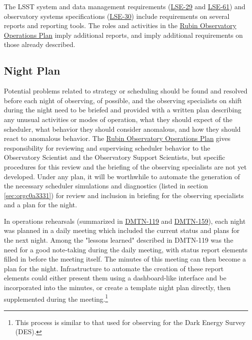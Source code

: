 The LSST system and data management requirements (\href{https://ls.st/lse-29}{LSE-29} and \href{https://ls.st/lse-61}{LSE-61}) and observatory systems specifications (\href{https://ls.st/lse-30}{LSE-30}) include requirements on several reports and reporting tools. The roles and activities in the \href{https://docushare.lsst.org/docushare/dsweb/Get/Document-36797/Rubin\%20Observatory\%20Operations\%20Plan\%20April\%202020.pdf}{Rubin Observatory Operations Plan} imply additional reports, and imply additional requirements on those already described.

\subsection{Night Plan}
\label{sec:org1754a94}

Potential problems related to strategy or scheduling should be found and resolved before each night of observing, of possible, and the observing specialists on shift during the night need to be briefed and provided with a written plan describing any unusual activities or modes of operation, what they should expect of the scheduler, what behavior they should consider anomalous, and how they should react to anomalous behavior.
The \href{https://docushare.lsst.org/docushare/dsweb/Get/Document-36797/Rubin\%20Observatory\%20Operations\%20Plan\%20April\%202020.pdf}{Rubin Observatory Operations Plan} gives responsibility for reviewing and supervising scheduler behavior to the Observatory Scientist and the Observatory Support Scientists, but specific procedures for this review and the briefing of the observing specialists are not yet developed.
Under any plan, it will be worthwhile to automate the generation of the necessary scheduler simulations and diagnostics (listed in section \ref{sec:orgc0a3331}) for review and inclusion in briefing for the observing specialists and a plan for the night.

In operations rehearsals (summarized in \href{https://dmtn-119.lsst.io}{DMTN-119} and \href{https://dmtn-159.lsst.io/}{DMTN-159}), each night was planned in a daily meeting which included the current status and plans for the next night.
Among the "lessons learned" described in DMTN-119 was the need for a good note-taking during the daily meeting, with status report elements filled in before the meeting itself. 
The minutes of this meeting can then become a plan for the night.
Infrastructure to automate the creation of these report elements could either present them using a dashboard-like interface and be incorporated into the minutes, or create a template night plan directly, then supplemented during the meeting.\footnote{This process is similar to that used for observing for the Dark Energy Survey (DES).}

